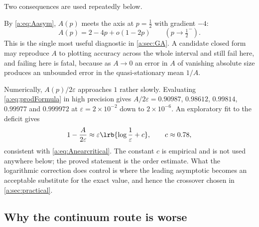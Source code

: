 Two consequences are used repeatedly below.

\begin{remark}
\label{a:rem:gradient}
By \cref{a:eq:Aasym}, $A(p)$ meets the axis at $p=\tfrac12$ with gradient $-4$:
\begin{equation}
\label{a:eq:gradient}
A(p) = 2-4p+o(1-2p)\qquad(p\to\tfrac12^-).
\end{equation}
This is the single most useful diagnostic in \cref{a:sec:GA}. A candidate closed
form may reproduce $A$ to plotting accuracy across the whole interval and still fail
here, and failing here is fatal, because as $A\to0$ an error in $A$ of vanishing
absolute size produces an unbounded error in the quasi-stationary mean $1/A$.
\end{remark}

\begin{remark}
\label{a:rem:rate}
Numerically, $A(p)/2\varepsilon$ approaches $1$ rather slowly. Evaluating
\cref{a:eq:prodFormula} in high precision gives $A/2\varepsilon = 0.90987$,
$0.98612$, $0.99814$, $0.99977$ and $0.999972$ at $\varepsilon=2\times10^{-2}$ down
to $2\times10^{-6}$. An exploratory fit to the deficit gives
\begin{equation}
\label{a:eq:empiricalcorrection}
1-\frac{A}{2\varepsilon}\approx\varepsilon\lrb{\log\frac1\varepsilon+c},
\qquad c\approx0.78,
\end{equation}
consistent with \cref{a:eq:Anearcritical}. The constant $c$ is empirical and is not
used anywhere below; the proved statement is the order estimate. What the
logarithmic correction does control is where the leading asymptotic becomes an
acceptable substitute for the exact value, and hence the crossover chosen in
\cref{a:sec:practical}.
\end{remark}

\subsection*{Why the continuum route is worse}

